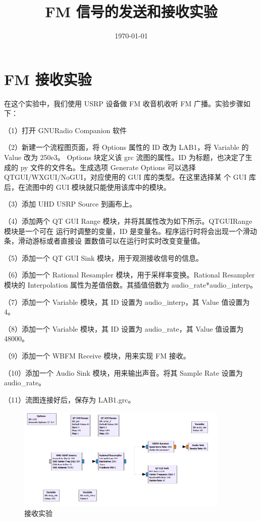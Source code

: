 \documentclass{../source/Experiment}
\title{FM 信号的发送和接收实验}
\date{\today}
\begin{document}
    \makecover
    \makeheader
    \section{FM 接收实验}
        在这个实验中，我们使用 USRP 设备做 FM 收音机收听 FM 广播。实验步骤如下：

        （1）打开 GNURadio Companion 软件

        （2）新建一个流程图页面，将 Options 属性的 ID 改为 LAB1，将 Variable 的 Value 改为 250e3。 Options 块定义该 grc 流图的属性。ID 为标题，也决定了生成的 py 文件的文件名。生成选项 Generate Options 可以选择 QTGUI/WXGUI/NoGUI，对应使用的 GUI 库的类型。在这里选择某 个 GUI 库后，在流图中的 GUI 模块就只能使用该库中的模块。

        （3）添加 UHD USRP Source 到画布上。

        （4）添加两个 QT GUI Range 模块，并将其属性改为如下所示。QTGUIRange 模块是一个可在 运行时调整的变量，ID 是变量名。程序运行时将会出现一个滑动条，滑动游标或者直接设 置数值可以在运行时实时改变变量值。

        （5）添加一个 QT GUI Sink 模块，用于观测接收信号的信息。

        （6）添加一个 Rational Resampler 模块，用于采样率变换。Rational Resampler 模块的 Interpolation 属性为差值倍数。其插值倍数为 audio\_rate*audio\_interp。

        （7）添加一个 Variable 模块，其 ID 设置为 audio\_interp，其 Value 值设置为 4。

        （8）添加一个 Variable 模块，其 ID 设置为 audio\_rate，其 Value 值设置为 48000。

        （9）添加一个 WBFM Receive 模块，用来实现 FM 接收。

        （10）添加一个 Audio Sink 模块，用来输出声音。将其 Sample Rate 设置为 audio\_rate。

        （11）流图连接好后，保存为 LAB1.grc。

        \begin{figure}[H]
            \centering
            \includegraphics[width = 0.9\textwidth]{lab7/receive.png}
            \caption{接收实验}
        \end{figure}
\end{document}
